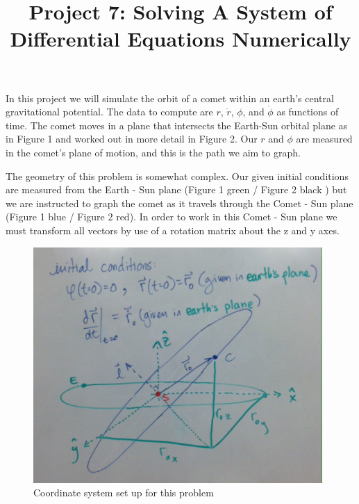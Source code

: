 \documentclass[11pt]{amsart}
\title{Project 7: Solving A System of Differential Equations Numerically}
\begin{document}
\maketitle

In this project we will simulate the orbit of a comet within an earth's central gravitational potential.  The data to compute are $r$, $\dot r$, $\phi$, and $\dot \phi$ as functions of time.  The comet moves in a plane that intersects the Earth-Sun orbital plane as in Figure 1 and worked out in more detail in Figure 2.  Our $r$ and $\phi$ are measured in the comet's plane of motion, and this is the path we aim to graph.
\newline

The geometry of this problem is somewhat complex.  Our given initial conditions are measured from the Earth - Sun plane (Figure 1 green / Figure 2 black ) but we are instructed to graph the comet as it travels through the Comet - Sun plane (Figure 1 blue / Figure 2 red).  In order to work in this Comet - Sun plane we must transform all vectors by use of a rotation matrix about the z and y axes.

\begin{figure}[ht!]
\centering
\includegraphics[width=110mm]{Orbit.jpg}
\caption{Coordinate system set up for this problem}
\label{overflow}
\end{figure}
\end{document}
